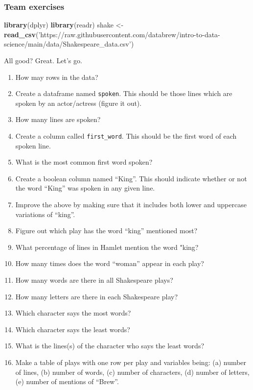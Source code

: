 \documentclass[
]{book}
\newenvironment{Shaded}{\begin{snugshade}}{\end{snugshade}}
\newcommand{\KeywordTok}[1]{\textcolor[rgb]{0.13,0.29,0.53}{\textbf{#1}}}
\newcommand{\NormalTok}[1]{#1}
\newcommand{\StringTok}[1]{\textcolor[rgb]{0.31,0.60,0.02}{#1}}
\begin{document}
\hypertarget{team-exercises-1}{%
\subsubsection*{Team exercises}\label{team-exercises-1}}

\begin{Shaded}
\begin{Highlighting}[]

\KeywordTok{library}\NormalTok{(dplyr)}
\KeywordTok{library}\NormalTok{(readr)}
\NormalTok{shake <-}\StringTok{ }\KeywordTok{read_csv}\NormalTok{(}\StringTok{'https://raw.githubusercontent.com/databrew/intro-to-data-science/main/data/Shakespeare_data.csv'}\NormalTok{)}
\end{Highlighting}
\end{Shaded}

All good? Great. Let's go.

\begin{enumerate}
\def\labelenumi{\arabic{enumi}.}
\item
  How may rows in the data?
\item
  Create a dataframe named \texttt{spoken}. This should be those lines which are spoken by an actor/actress (figure it out).
\item
  How many lines are spoken?
\item
  Create a column called \texttt{first\_word}. This should be the first word of each spoken line.
\item
  What is the most common first word spoken?
\item
  Create a boolean column named ``King''. This should indicate whether or not the word ``King'' was spoken in any given line.
\item
  Improve the above by making sure that it includes both lower and uppercase variations of ``king''.
\item
  Figure out which play has the word ``king'' mentioned most?
\item
  What percentage of lines in Hamlet mention the word "king?
\item
  How many times does the word ``woman'' appear in each play?
\item
  How many words are there in all Shakespeare plays?
\item
  How many letters are there in each Shakespeare play?
\item
  Which character says the most words?
\item
  Which character says the least words?
\item
  What is the lines(s) of the character who says the least words?
\item
  Make a table of plays with one row per play and variables being: (a) number of lines, (b) number of words, (c) number of characters, (d) number of letters, (e) number of mentions of ``Brew''.
\end{enumerate}
\end{document}
